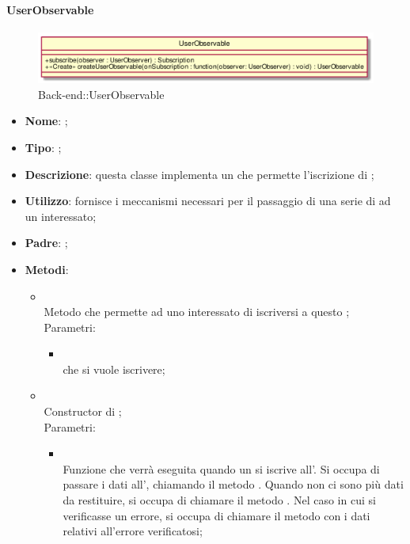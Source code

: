 \hypertarget{UserObservable_label}{\paragraph{UserObservable}}
\begin{figure}[h]
	\centering
	\includegraphics[width=\textwidth,height=\textheight,keepaspectratio]{images/ClassUserObservable.png}
	\caption{Back-end::UserObservable}
\end{figure}
\begin{itemize}
	\item \textbf{Nome}: ;
	\item \textbf{Tipo}: ;
	\item \textbf{Descrizione}: questa classe implementa un  che permette l'iscrizione di ;
	\item \textbf{Utilizzo}: fornisce i meccanismi necessari per il passaggio di una serie di  ad un  interessato;
	\item \textbf{Padre}: ;
	\item \textbf{Metodi}:
	\begin{itemize}
		\item[]  \\
		Metodo che permette ad uno  interessato di iscriversi a questo ;\\
		Parametri:
		\begin{itemize}
			\item {} \\
			 che si vuole iscrivere;
		\end{itemize}
		\item[]  \\
		Constructor di ;\\
		Parametri:
		\begin{itemize}
			\item {} \\
			Funzione che verrà eseguita quando un  si iscrive all'. Si occupa di passare i dati all', chiamando il metodo . Quando non ci sono più dati da restituire, si occupa di chiamare il metodo . Nel caso in cui si verificasse un errore, si occupa di chiamare il metodo  con i dati relativi all'errore verificatosi;
		\end{itemize}
	\end{itemize}
\end{itemize}

